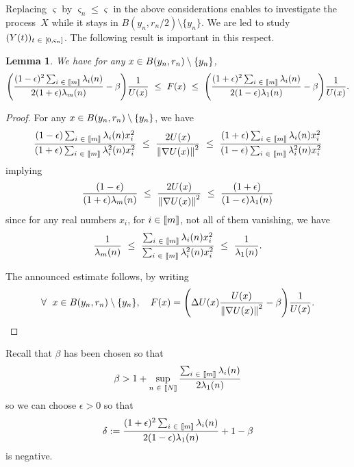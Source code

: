 \documentclass[10pt]{amsart}
\newtheorem{lemm}[theo]{Lemma}\newtheorem{prop}[theo]{Proposition}\newtheorem{coro}[theo]{Corollary}\newtheorem{conj}[theo]{Conjecture}
\theoremstyle{definition}\newtheorem{defi}[theo]{Definition}\newtheorem{rema}[theo]{Remark}\newtheorem{exam}[theo]{Example}\newtheorem{exem}[theo]{Example}\newtheorem{nota}[theo]{Notation}
\newcommand{\f}[2]{\frac{#1}{#2}}
\newcommand{\na}{\nabla}
\newcommand{\tr}{\Delta}
\newcommand{\fo}{\forall\ }
\let\originalleft\left
\let\originalright\right
\renewcommand{\left}{\mathopen{}\mathclose\bgroup\originalleft}
\renewcommand{\right}{\aftergroup\egroup\originalright}
\let\oldin\in
\renewcommand{\in}{\mathchoice{\oldin}{\oldin}{\,\oldin\,}{\,\oldin\,}}
\let\oldforall\forall
\renewcommand*{\forall}{\mathrel{\oldforall}}
\newcommand{\llbracket}{\mathopen{[\mkern -2.7mu[}}
\newcommand{\rrbracket}{\mathclose{]\mkern -2.7mu]}}
\newcommand{\lin}{\llbracket}
\newcommand{\rin}{\rrbracket}
\begin{document}
Replacing $\varsigma$ by $\varsigma_n\leq \varsigma$ in the above considerations enables to investigate the process~$X$ while it stays in $B(y_n,r_n/2)\setminus\{y_n\}$. We are led to study $(Y(t))_{t\in[0,\varsigma_n]}$. The following result is important in this respect.

\begin{lemm}\label{comp}
We have for any $x\in B(y_n,r_n)\setminus\{y_n\}$,
\begin{equation*}
\left(\f{(1-\epsilon)^2\sum_{i\in\lin m\rin}\lambda_i(n)}{2(1+\epsilon)\lambda_m(n)}-\beta\right)\f{1}{{U(x)}}\ \leq \ F(x)\ \leq \ \left(\f{(1+\epsilon)^2\sum_{i\in\lin m\rin}\lambda_i(n)}{2(1-\epsilon)\lambda_1(n)}-\beta\right)\f{1}{{U(x)}}.
\end{equation*}
\end{lemm}
\begin{proof}
For any $ x\in B(y_n,r_n)\setminus\{y_n\}$, we have
\begin{equation*}
\f{(1-\epsilon)\sum_{i\in\lin m\rin}\lambda_i(n)x_i^2}{(1+\epsilon)\sum_{i\in\lin m\rin}\lambda_i^2(n)x_i^2}\ \leq \ \f{2U(x)}{\left\| \na U(x)\right\|^2}\ \leq \ \f{(1+\epsilon)\sum_{i\in\lin m\rin}\lambda_i(n)x_i^2}{(1-\epsilon)\sum_{i\in\lin m\rin}\lambda_i^2(n)x_i^2}
\end{equation*}
implying
\begin{equation*}
\f{(1-\epsilon)}{(1+\epsilon)\lambda_m(n)}\ \leq \ \f{2U(x)}{\left\| \na U(x)\right\|^2}\ \leq \ \f{(1+\epsilon)}{(1-\epsilon)\lambda_1(n)}
\end{equation*}
since for any real numbers $x_i$, for $i\in\lin m\rin$, not all of them vanishing, we have
\begin{equation*}
\f1{\lambda_m(n)}\ \leq \ \f{\sum_{i\in\lin m\rin}\lambda_i(n)x_i^2}{\sum_{i\in\lin m\rin}\lambda_i^2(n)x_i^2}\ \leq \ \f1{\lambda_1(n)}.
\end{equation*}


The announced estimate follows, by writing
\begin{equation*}
\fo x\in B(y_n,r_n)\setminus\{y_n\},\quad F(x) = \left(\tr U(x)\f{U(x)}{\left\| \na U(x)\right\|^2}-\beta\right)\f{1}{U(x)}.\qedhere
\end{equation*}
\end{proof}


Recall that $\beta$ has been chosen so that
\begin{equation*}
\beta > 1+\sup_{n\in\lin N\rin}\f{\sum_{i\in\lin m\rin}\lambda_i(n)}{2\lambda_1(n)}
\end{equation*}
so we can choose $\epsilon>0$ so that
\begin{equation*}
\delta := 
\f{(1+\epsilon)^2\sum_{i\in\lin m\rin}\lambda_i(n)}{2(1-\epsilon)\lambda_1(n)}+1-\beta
\end{equation*}
is negative.
\end{document}
